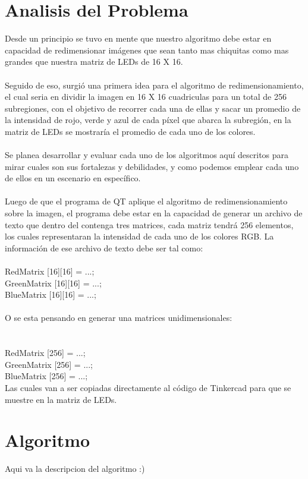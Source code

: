 \documentclass{article}
\begin{document}
\section{Analisis del Problema} \label{Analisis}
Desde un principio se tuvo en mente que nuestro algoritmo debe estar en capacidad de redimensionar imágenes que sean tanto mas chiquitas como mas grandes que nuestra matriz de LEDs de 16 X 16.
\\
\\
Seguido de eso, surgió una primera idea para el algoritmo de redimensionamiento, el cual seria en dividir la imagen en 16 X 16 cuadriculas para un total de 256 subregiones, con el objetivo de recorrer cada una de ellas y sacar un promedio de la intensidad de rojo, verde y azul de cada píxel que abarca la subregión, en la matriz de LEDs se mostraría el promedio de cada uno de los colores.
\\
\\
Se planea desarrollar y evaluar cada uno de los algoritmos aquí descritos para mirar cuales son sus fortalezas y debilidades, y como podemos emplear cada uno de ellos en un escenario en específico.
\\
\\
Luego de que el programa de QT aplique el algoritmo de redimensionamiento sobre la imagen, el programa debe estar en la capacidad de generar un archivo de texto que dentro del contenga tres matrices, cada matriz tendrá 256 elementos, los cuales representaran la intensidad de cada uno de los colores RGB. La información de ese archivo de texto debe ser tal como:
\\
\\
RedMatrix [16][16] = {...};
\\
GreenMatrix [16][16] = {...};
\\
BlueMatrix [16][16] = {...};
\\
\\
O se esta pensando en generar una matrices unidimensionales:\\
\\
\\
RedMatrix [256] = {...};
\\
GreenMatrix [256] = {...};
\\
BlueMatrix [256] = {...};
\\

Las cuales van a ser copiadas directamente al código de Tinkercad para que se muestre en la matriz de LEDs.



\section{Algoritmo} \label{algoritmo}
Aqui va la descripcion del algoritmo :)
\end{document}
